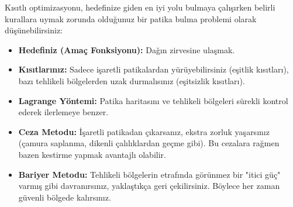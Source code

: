 \begin{tcolorbox}[title=Kısıtlı Optimizasyon Analojisi: Patika Bulma]
Kısıtlı optimizasyonu, hedefinize giden en iyi yolu bulmaya çalışırken belirli kurallara uymak zorunda olduğunuz bir patika bulma problemi olarak düşünebilirsiniz:

\begin{itemize}
    \item \textbf{Hedefiniz (Amaç Fonksiyonu):} Dağın zirvesine ulaşmak.
    \item \textbf{Kısıtlarınız:} Sadece işaretli patikalardan yürüyebilirsiniz (eşitlik kısıtları), bazı tehlikeli bölgelerden uzak durmalısınız (eşitsizlik kısıtları).
    
    \item \textbf{Lagrange Yöntemi:} Patika haritasını ve tehlikeli bölgeleri sürekli kontrol ederek ilerlemeye benzer.
    
    \item \textbf{Ceza Metodu:} İşaretli patikadan çıkarsanız, ekstra zorluk yaşarsınız (çamura saplanma, dikenli çalılıklardan geçme gibi). Bu cezalara rağmen bazen kestirme yapmak avantajlı olabilir.
    
    \item \textbf{Bariyer Metodu:} Tehlikeli bölgelerin etrafında görünmez bir "itici güç" varmış gibi davranırsınız, yaklaştıkça geri çekilirsiniz. Böylece her zaman güvenli bölgede kalırsınız.
\end{itemize}
\end{tcolorbox}

